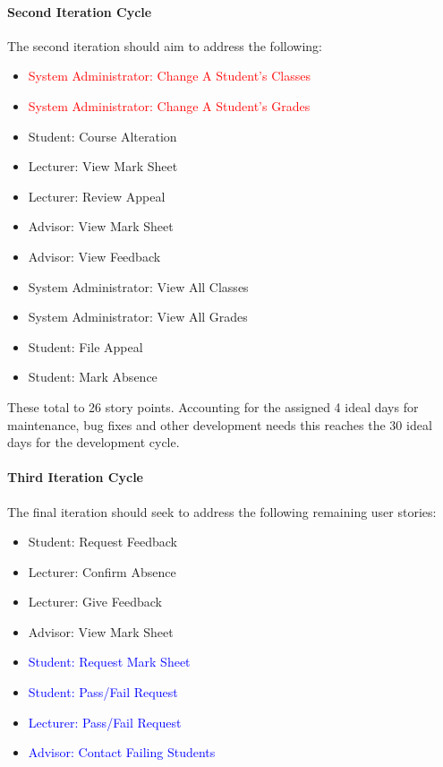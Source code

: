 \documentclass[11pt]{article}
\begin{document}
\paragraph{Second Iteration Cycle}
The second iteration should aim to address the following:
\begin{itemize}
\item{\textcolor{red}{System Administrator: Change A Student's Classes}}
\item{\textcolor{red}{System Administrator: Change A Student's Grades}}
\item{\textcolor{mauve}{Student: Course Alteration}}
\item{\textcolor{mauve}{Lecturer: View Mark Sheet}}
\item{\textcolor{mauve}{Lecturer: Review Appeal}}
\item{\textcolor{mauve}{Advisor: View Mark Sheet}}
\item{\textcolor{mauve}{Advisor: View Feedback}}
\item{\textcolor{mauve}{System Administrator: View All Classes}}
\item{\textcolor{mauve}{System Administrator: View All Grades}}
\item{\textcolor{dkgreen}{Student: File Appeal}}
\item{\textcolor{dkgreen}{Student: Mark Absence}}
\end{itemize}
These total to 26 story points. Accounting for the assigned 4 ideal days for maintenance, bug fixes and other development needs this reaches the 30 ideal days for the development cycle.
\paragraph{Third Iteration Cycle}
The final iteration should seek to address the following remaining user stories:
\begin{itemize}
\item{\textcolor{dkgreen}{Student: Request Feedback}}
\item{\textcolor{dkgreen}{Lecturer: Confirm Absence}}
\item{\textcolor{dkgreen}{Lecturer: Give Feedback}}
\item{\textcolor{dkgreen}{Advisor: View Mark Sheet}}
\item{\textcolor{blue}{Student: Request Mark Sheet}}
\item{\textcolor{blue}{Student: Pass/Fail Request}}
\item{\textcolor{blue}{Lecturer: Pass/Fail Request}}
\item{\textcolor{blue}{Advisor: Contact Failing Students}}
\end{itemize}
\end{document}

